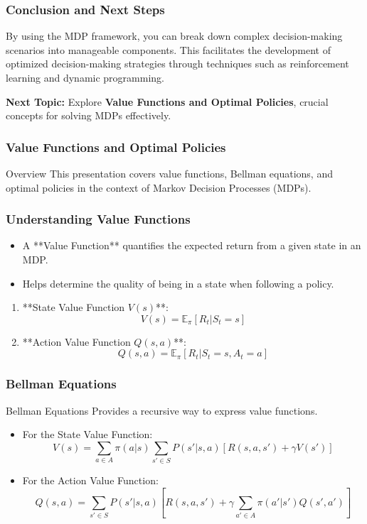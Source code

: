 \documentclass{beamer}
\begin{document}
\begin{frame}[fragile]
    \frametitle{Conclusion and Next Steps}
    By using the MDP framework, you can break down complex decision-making scenarios into manageable components. This facilitates the development of optimized decision-making strategies through techniques such as reinforcement learning and dynamic programming.
    
    \textbf{Next Topic:} Explore \textbf{Value Functions and Optimal Policies}, crucial concepts for solving MDPs effectively.
\end{frame}

\begin{frame}[fragile]
    \frametitle{Value Functions and Optimal Policies}
    \begin{block}{Overview}
        This presentation covers value functions, Bellman equations, and optimal policies in the context of Markov Decision Processes (MDPs).
    \end{block}
\end{frame}

\begin{frame}[fragile]
    \frametitle{Understanding Value Functions}
    \begin{itemize}
        \item A **Value Function** quantifies the expected return from a given state in an MDP.
        \item Helps determine the quality of being in a state when following a policy.
    \end{itemize}
    
    \begin{enumerate}
        \item **State Value Function \( V(s) \)**: 
            \[
            V(s) = \mathbb{E}_\pi \left[ R_t | S_t = s \right]
            \]
        \item **Action Value Function \( Q(s, a) \)**: 
            \[
            Q(s, a) = \mathbb{E}_\pi \left[ R_t | S_t = s, A_t = a \right]
            \]
    \end{enumerate}
\end{frame}

\begin{frame}[fragile]
    \frametitle{Bellman Equations}
    \begin{block}{Bellman Equations}
        Provides a recursive way to express value functions.
    \end{block}
    
    \begin{itemize}
        \item For the State Value Function:
            \[
            V(s) = \sum_{a \in A} \pi(a | s) \sum_{s' \in S} P(s' | s, a) [R(s, a, s') + \gamma V(s')]
            \]
        \item For the Action Value Function:
            \[
            Q(s, a) = \sum_{s' \in S} P(s' | s, a) [R(s, a, s') + \gamma \sum_{a' \in A} \pi(a' | s') Q(s', a')]
            \]
    \end{itemize}
\end{frame}
\end{document}
